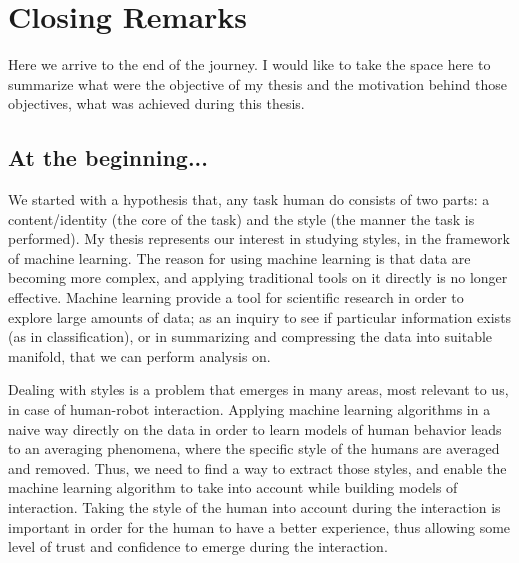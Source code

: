 \chapter{Closing Remarks} \label{ch:closing_remarks}
\minitoc%

\par Here we arrive to the end of the journey. I would like to take the space here to summarize what were the objective of my thesis and the motivation behind those objectives, what was achieved during this thesis.

\section{At the beginning...}

\par We started with a hypothesis that, any task human do consists of two parts: a content/identity (the core of the task) and the style (the manner the task is performed). My thesis represents our interest in studying styles, in the framework of machine learning. The reason for using machine learning is that data are becoming more complex, and applying traditional tools on it directly is no longer effective. Machine learning provide a tool for scientific research in order to explore large amounts of data; as an inquiry to see if particular information exists (as in classification), or in summarizing and compressing the data into suitable manifold, that we can perform analysis on.

\par Dealing with styles is a problem that emerges in many areas, most relevant to us, in case of human-robot interaction. Applying machine learning algorithms in a naive way directly on the data in order to learn models of human behavior leads to an averaging phenomena, where the specific style of the humans are averaged and removed. Thus, we need to find a way to extract those styles, and enable the machine learning algorithm to take into account while building models of interaction. Taking the style of the human into account during the interaction is important in order for the human to have a better experience, thus allowing some level of trust and confidence to emerge during the interaction.

